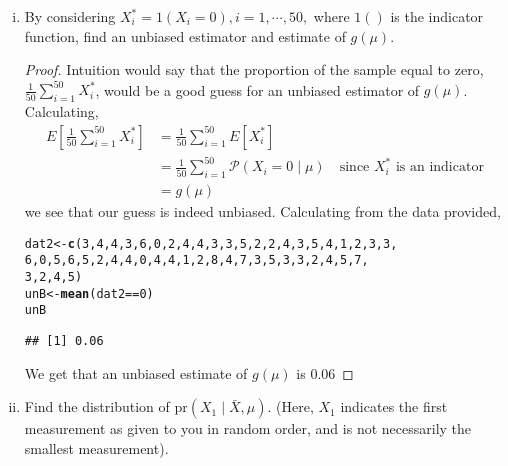 \documentclass[letterpaper, 12pt]{article}\usepackage{graphicx, color}
\makeatletter
\newcommand{\hlfunctioncall}[1]{\textcolor[rgb]{0.501960784313725,0,0.329411764705882}{\textbf{#1}}}%
\newenvironment{kframe}{%
 \def\at@end@of@kframe{}%
 \ifinner\ifhmode%
  \def\at@end@of@kframe{\end{minipage}}%
  \begin{minipage}{\columnwidth}%
 \fi\fi%
 \def\FrameCommand##1{\hskip\@totalleftmargin \hskip-\fboxsep
 \colorbox{shadecolor}{##1}\hskip-\fboxsep
     \hskip-\linewidth \hskip-\@totalleftmargin \hskip\columnwidth}%
 \MakeFramed {\advance\hsize-\width
   \@totalleftmargin\z@ \linewidth\hsize
   \@setminipage}}%
 {\par\unskip\endMakeFramed%
 \at@end@of@kframe}
\newenvironment{knitrout}{}{} %
\newcommand{\cP}{\mathcal{P}}
\newcommand{\pr}{\text{pr}}
\newcommand{\sbs}{\;|\;} %
\makeatother
\begin{document}
\begin{enumerate}
\begin{enumerate}[(i)]
\item
By considering $X_i^* = 1 (X_i = 0), i = 1, \cdots, 50,$ where $1()$ is the indicator function, find an unbiased estimator and estimate of $g(\mu)$.
\begin{proof}
Intuition would say that the proportion of the sample equal to zero, $\frac{1}{50} \sum_{i=1}^{50} X_i^*$, would be a good guess for an unbiased estimator of $g(\mu)$. Calculating,
\begin{align}
E\left[  \frac{1}{50} \sum_{i=1}^{50} X_i^* \right] 
&= \frac{1}{50} \sum_{i=1}^{50} E[X_i^*] \\
&= \frac{1}{50} \sum_{i=1}^{50} \cP (X_i = 0 \sbs \mu)
\quad \text{since $X_i^*$ is an indicator}  \\
&= g(\mu)
\end{align}
we see that our guess is indeed unbiased.
Calculating from the data provided, 


\begin{knitrout}
\color{fgcolor}\begin{kframe}
\begin{alltt}
dat2 <- \hlfunctioncall{c}(3, 4, 4, 3, 6, 0, 2, 4, 4, 3, 3, 5, 2, 2, 4, 3, 5, 4, 1, 2, 3, 3, 
    6, 0, 5, 6, 5, 2, 4, 4, 0, 4, 4, 1, 2, 8, 4, 7, 3, 5, 3, 3, 2, 4, 5, 7, 
    3, 2, 4, 5)
unB <- \hlfunctioncall{mean}(dat2 == 0)
unB
\end{alltt}
\begin{verbatim}
## [1] 0.06
\end{verbatim}
\end{kframe}
\end{knitrout}


We get that an unbiased estimate of $g(\mu)$ is 0.06
\end{proof}

\item
Find the distribution of $\pr(X_1 \sbs \bar{X}, \mu)$. (Here, $X_1$ indicates the first measurement as given to you in random order, and is not necessarily the smallest measurement).


\end{enumerate}
\end{enumerate}
\end{document}

